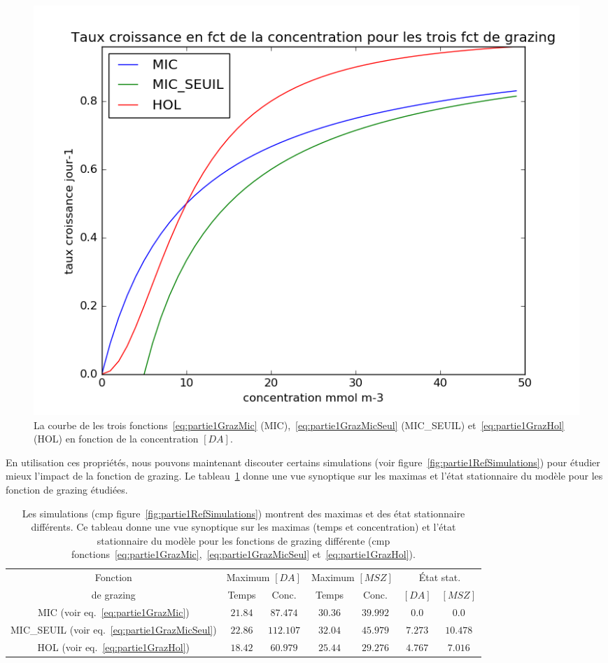 {\begin{figure}[h!]
  \includegraphics[width=\textwidth]{partie1/grazingFct.png}
  \caption{
La courbe de les trois fonctions~\ref{eq:partie1GrazMic} (MIC),~\ref{eq:partie1GrazMicSeul} (MIC\_SEUIL)
et~\ref{eq:partie1GrazHol} (HOL) en fonction de la concentration $[DA]$.
}
  \label{fig:partie1grazingFcts}
\end{figure}

\par{
En utilisation ces propriétés, nous pouvons maintenant discouter certains simulations (voir
figure~\ref{fig:partie1RefSimulations}) pour étudier mieux l'impact de la fonction de grazing.
Le tableau~\ref{tab:partie1appPropFctGrazing} donne une vue synoptique sur les maximas et l'état
stationnaire du modèle pour les fonction de grazing étudiées.
}
\begin{table}[h!]
\begin{center}
\begin{tabular}{ | c | c c | c c | c c |}
\hline
Fonction & \multicolumn{2}{c|}{Maximum $[DA]$} & \multicolumn{2}{c|}{Maximum $[MSZ]$} &
\multicolumn{2}{c|}{État stat.} \\
de grazing & Temps & Conc. & Temps & Conc. & $[DA]$ & $[MSZ]$ \\
\hline
MIC (voir eq.~\ref{eq:partie1GrazMic}) & $21.84$ & $87.474$ & $30.36$ & $39.992$ & $0.0$ & $0.0$ \\
MIC\_SEUIL (voir eq.~\ref{eq:partie1GrazMicSeul}) & $22.86$ & $112.107$ & $32.04$ & $45.979$ & $7.273$ & $10.478$ \\
HOL (voir eq.~\ref{eq:partie1GrazHol}) & $18.42$ & $60.979$ & $25.44$ & $29.276$ & $4.767$ & $7.016$ \\
\hline
\end{tabular}
\end{center}
  \caption{Les simulations (cmp figure~\ref{fig:partie1RefSimulations}) montrent des maximas et
des état stationnaire différents. Ce tableau donne une vue synoptique sur les maximas
(temps et concentration) et l'état stationnaire du modèle pour les fonctions de grazing différente
(cmp fonctions~\ref{eq:partie1GrazMic},~\ref{eq:partie1GrazMicSeul} et~\ref{eq:partie1GrazHol}).}
  \label{tab:partie1appPropFctGrazing}
\end{table}

}
